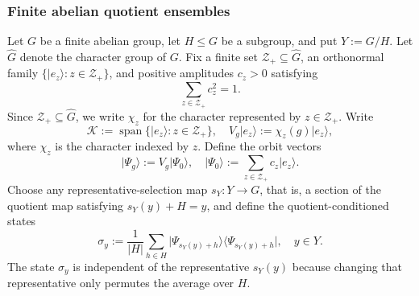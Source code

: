 \documentclass[11pt]{article}
\newcommand{\1}{\mathbf 1}
\newcommand{\ket}[1]{\lvert #1\rangle}
\newcommand{\bra}[1]{\langle #1\rvert}
\theoremstyle{plain}
\theoremstyle{definition}
\theoremstyle{remark}
\begin{document}
\subsubsection{Finite abelian quotient ensembles}
Let $G$ be a finite abelian group, let $H\le G$ be a subgroup, and put
$Y:=G/H$.  Let
$\widehat G$ denote the character group of $G$.  Fix a finite set
$\mathcal Z_+\subseteq\widehat G$, an orthonormal family
$\{\ket{e_z}:z\in\mathcal Z_+\}$, and positive amplitudes
$c_z>0$ satisfying
\begin{equation}
 \sum_{z\in\mathcal Z_+}c_z^2=1.
 \label{eq:abstract-amplitude-normalization}
\end{equation}
Since $\mathcal Z_+\subseteq\widehat G$, we write $\chi_z$ for the
character represented by $z\in\mathcal Z_+$.
Write
\begin{equation}
 \mathcal K:=\operatorname{span}\{\ket{e_z}:z\in\mathcal Z_+\},
 \quad
 V_g\ket{e_z}:=\chi_z(g)\ket{e_z},
 \label{eq:abstract-sector-representation}
\end{equation}
where $\chi_z$ is the character indexed by $z$.  Define the orbit vectors
\begin{equation}
 \ket{\Psi_g}:=V_g\ket{\Psi_0},
 \quad
 \ket{\Psi_0}:=\sum_{z\in\mathcal Z_+}c_z\ket{e_z}.
 \label{eq:abstract-orbit-vectors}
\end{equation}
Choose any representative-selection map $s_Y:Y\to G$, that is, a section of
the quotient map satisfying $s_Y(y)+H=y$, and define the quotient-conditioned
states
\begin{equation}
 \sigma_y:=\frac1{\lvert H\rvert}\sum_{h\in H}
 \ket{\Psi_{s_Y(y)+h}}\!\bra{\Psi_{s_Y(y)+h}},
 \quad y\in Y.
 \label{eq:abstract-conditioned-ensemble}
\end{equation}
The state $\sigma_y$ is independent of the representative $s_Y(y)$ because
changing that representative only permutes the average over $H$.
\end{document}
